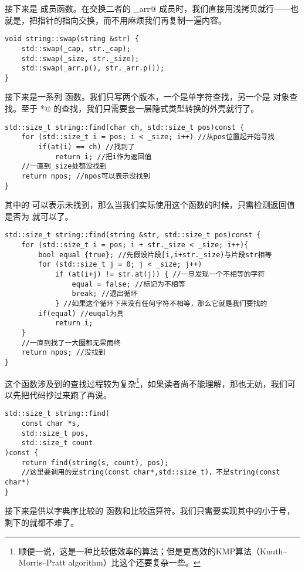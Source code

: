 接下来是 \lstinline@swap@ 成员函数。在交换二者的 \lstinline@_arr@ 成员时，我们直接用浅拷贝就行——也就是，把指针的指向交换，而不用麻烦我们再复制一遍内容。\par
\begin{lstlisting}
void string::swap(string &str) {
    std::swap(_cap, str._cap);
    std::swap(_size, str._size);
    std::swap(_arr.p(), str._arr.p());
}
\end{lstlisting}\par
接下来是一系列 \lstinline@find@ 函数。我们只写两个版本，一个是单字符查找，另一个是 \lstinline@string@ 对象查找。至于 \lstinline@char*@ 的查找，我们只需要套一层隐式类型转换的外壳就行了。
\begin{lstlisting}
std::size_t string::find(char ch, std::size_t pos)const {
    for (std::size_t i = pos; i < _size; i++) //从pos位置起开始寻找
        if(at(i) == ch) //找到了
            return i; //把i作为返回值
    //一直到_size处都没找到
    return npos; //npos可以表示没找到
}
\end{lstlisting}
其中的 \lstinline@npos@ 可以表示未找到，那么当我们实际使用这个函数的时候，只需检测返回值是否为 \lstinline@npos@ 就可以了。
\begin{lstlisting}
std::size_t string::find(string &str, std::size_t pos)const {
    for (std::size_t i = pos; i + str._size < _size; i++){
        bool equal {true}; //先假设片段[i,i+str._size)与片段str相等
        for (std::size_t j = 0; j < _size; j++)
            if (at(i+j) != str.at(j)) { //一旦发现一个不相等的字符
                equal = false; //标记为不相等
                break; //退出循环
            } //如果这个循环下来没有任何字符不相等，那么它就是我们要找的
        if(equal) //euqal为真
            return i;
    }
    //一直到找了一大圈都无果而终
    return npos; //没找到
}
\end{lstlisting}
这个函数涉及到的查找过程较为复杂\footnote{顺便一说，这是一种比较低效率的算法；但是更高效的KMP算法（Knuth–Morris–Pratt algorithm）比这个还要复杂一些。}，如果读者尚不能理解，那也无妨，我们可以先把代码抄过来跑了再说。
\begin{lstlisting}
std::size_t string::find(
    const char *s,
    std::size_t pos,
    std::size_t count
)const {
    return find(string(s, count), pos);
    //这里要调用的是string(const char*,std::size_t)，不是string(const char*)
}
\end{lstlisting}\par
接下来是供以字典序比较的 \lstinline@compare@ 函数和比较运算符。我们只需要实现其中的小于号，剩下的就都不难了。
